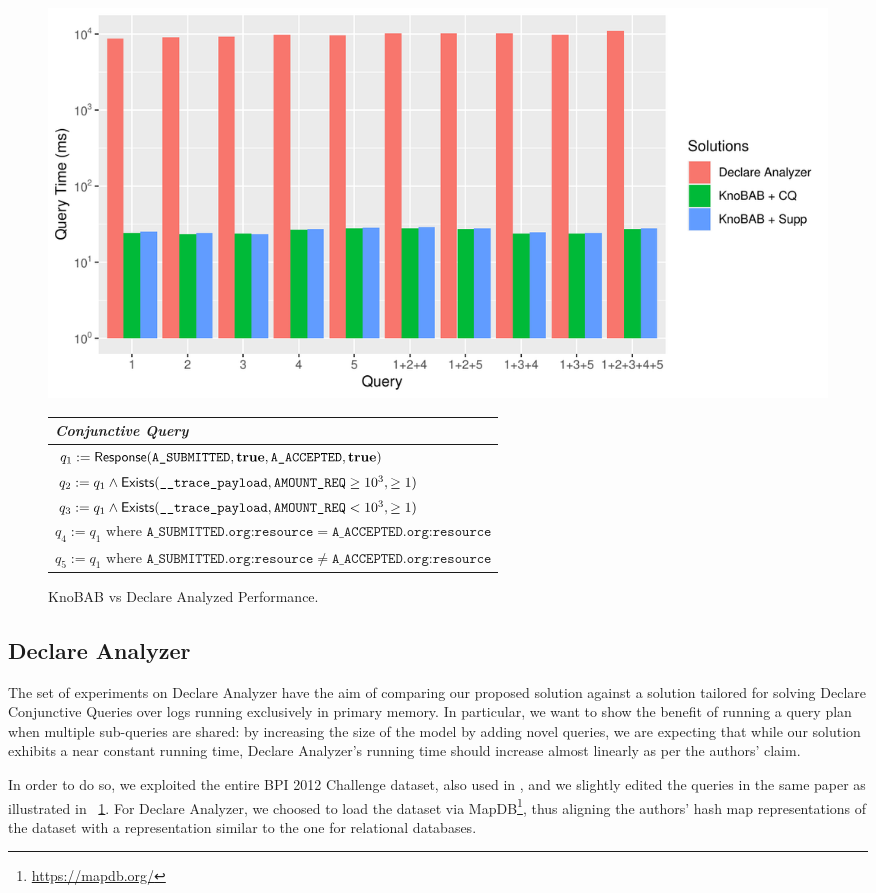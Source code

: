 \begin{figure}[!t]
	\centering
	\includegraphics[width=.7\textwidth]{images/Buratto.pdf}
	\begin{tabular}{l}
		\toprule
		\textit{Conjunctive Query}\\ 
		\midrule
		$q_1:= \textsf{Response}(\texttt{A\_SUBMITTED},\textbf{true},\texttt{A\_ACCEPTED},\textbf{true})$ \\
		$q_2:= q_1\wedge \textsf{Exists}(\texttt{\_\_trace\_payload},\texttt{AMOUNT\_REQ}\geq 10^3,{\geq 1})$ \\
		$q_3:=q_1\wedge \textsf{Exists}(\texttt{\_\_trace\_payload},\texttt{AMOUNT\_REQ}< 10^3,{\geq 1})$ \\
		$q_4:=q_1\textrm{ where }\texttt{A\_SUBMITTED.org:resource}=\texttt{A\_ACCEPTED.org:resource}$ \\
		$q_5:=q_1\textrm{ where }\texttt{A\_SUBMITTED.org:resource}\neq\texttt{A\_ACCEPTED.org:resource}$ \\
		\bottomrule
	\end{tabular}
	\caption{KnoBAB vs Declare Analyzed Performance.}\label{fig:vsBuatto}
\end{figure} 
\subsection{Declare Analyzer}\label{ssec:declan}
The set of experiments on Declare Analyzer have the aim of comparing our proposed solution against a solution tailored for solving Declare Conjunctive Queries over logs running exclusively in primary memory. In particular, we want to show the benefit of running a query plan when multiple sub-queries are shared: by increasing the size of the model by adding novel queries, we are expecting that while our solution exhibits a near constant running time, Declare Analyzer's running time should increase almost linearly as per the authors' claim.

In order to do so, we exploited the entire BPI 2012 Challenge dataset, also used in \cite{BurattinMS16}, and we slightly edited the queries in the same paper as illustrated in \figurename~\ref{fig:vsBuatto}. For Declare Analyzer, we choosed to load the dataset via MapDB\footnote{\url{https://mapdb.org/}}, thus aligning the authors' hash map representations of the dataset with a representation similar to the one for relational databases. 

